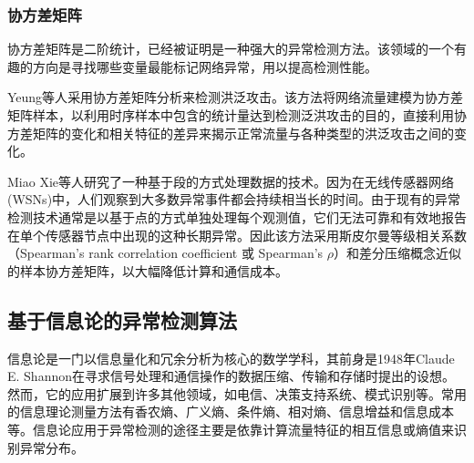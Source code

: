 \subsubsection{协方差矩阵}

协方差矩阵是二阶统计，已经被证明是一种强大的异常检测方法。该领域的一个有趣的方向是寻找哪些变量最能标记网络异常，用以提高检测性能。

Yeung等人\cite{yeung2007covariance}采用协方差矩阵分析来检测洪泛攻击。该方法将网络流量建模为协方差矩阵样本，以利用时序样本中包含的统计量达到检测泛洪攻击的目的，直接利用协方差矩阵的变化和相关特征的差异来揭示正常流量与各种类型的洪泛攻击之间的变化。


 Miao Xie等人\cite{xie2014segment}研究了一种基于段的方式处理数据的技术。因为在无线传感器网络(WSNs)中，人们观察到大多数异常事件都会持续相当长的时间。由于现有的异常检测技术通常是以基于点的方式单独处理每个观测值，它们无法可靠和有效地报告在单个传感器节点中出现的这种长期异常。因此该方法采用斯皮尔曼等级相关系数（Spearman's rank correlation coefficient 或 Spearman's $\rho$）和差分压缩概念近似的样本协方差矩阵，以大幅降低计算和通信成本。










\subsection{基于信息论的异常检测算法}

信息论是一门以信息量化和冗余分析为核心的数学学科，其前身是1948年Claude E. Shannon在寻求信号处理和通信操作的数据压缩、传输和存储时提出的设想\cite{shannon1948mathematical}。然而，它的应用扩展到许多其他领域，如电信、决策支持系统、模式识别等。常用的信息理论测量方法有香农熵、广义熵、条件熵、相对熵、信息增益和信息成本等。信息论应用于异常检测的途径主要是依靠计算流量特征的相互信息或熵值来识别异常分布。

